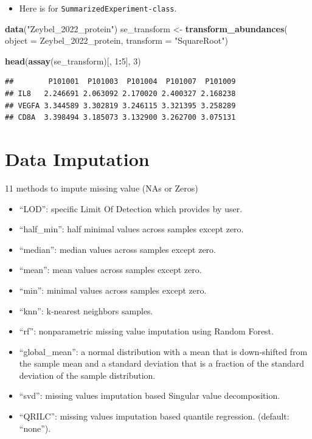 \documentclass[
]{book}
\newenvironment{Shaded}{\begin{snugshade}}{\end{snugshade}}
\newcommand{\AttributeTok}[1]{\textcolor[rgb]{0.13,0.29,0.53}{#1}}
\newcommand{\DecValTok}[1]{\textcolor[rgb]{0.00,0.00,0.81}{#1}}
\newcommand{\FunctionTok}[1]{\textcolor[rgb]{0.13,0.29,0.53}{\textbf{#1}}}
\newcommand{\NormalTok}[1]{#1}
\newcommand{\OtherTok}[1]{\textcolor[rgb]{0.56,0.35,0.01}{#1}}
\newcommand{\SpecialCharTok}[1]{\textcolor[rgb]{0.81,0.36,0.00}{\textbf{#1}}}
\newcommand{\StringTok}[1]{\textcolor[rgb]{0.31,0.60,0.02}{#1}}
\providecommand{\tightlist}{%
  \setlength{\itemsep}{0pt}\setlength{\parskip}{0pt}}
\begin{document}
\begin{itemize}
\tightlist
\item
  Here is for \texttt{SummarizedExperiment-class}.
\end{itemize}

\begin{Shaded}
\begin{Highlighting}[]
\FunctionTok{data}\NormalTok{(}\StringTok{"Zeybel\_2022\_protein"}\NormalTok{)}
\NormalTok{se\_transform }\OtherTok{\textless{}{-}} \FunctionTok{transform\_abundances}\NormalTok{(}
  \AttributeTok{object =}\NormalTok{ Zeybel\_2022\_protein,}
  \AttributeTok{transform =} \StringTok{"SquareRoot"}\NormalTok{)}

\FunctionTok{head}\NormalTok{(}\FunctionTok{assay}\NormalTok{(se\_transform)[, }\DecValTok{1}\SpecialCharTok{:}\DecValTok{5}\NormalTok{], }\DecValTok{3}\NormalTok{)}
\end{Highlighting}
\end{Shaded}

\begin{verbatim}
##        P101001  P101003  P101004  P101007  P101009
## IL8   2.246691 2.063092 2.170020 2.400327 2.168238
## VEGFA 3.344589 3.302819 3.246115 3.321395 3.258289
## CD8A  3.398494 3.185073 3.132900 3.262700 3.075131
\end{verbatim}

\hypertarget{data-imputation}{%
\section{Data Imputation}\label{data-imputation}}

11 methods to impute missing value (NAs or Zeros)

\begin{itemize}
\item
  ``LOD'': specific Limit Of Detection which provides by user.
\item
  ``half\_min'': half minimal values across samples except zero.
\item
  ``median'': median values across samples except zero.
\item
  ``mean'': mean values across samples except zero.
\item
  ``min'': minimal values across samples except zero.
\item
  ``knn'': k-nearest neighbors samples.
\item
  ``rf'': nonparametric missing value imputation using Random Forest.
\item
  ``global\_mean'': a normal distribution with a mean that is down-shifted from the sample mean and a standard deviation that is a fraction of the standard deviation of the sample distribution.
\item
  ``svd'': missing values imputation based Singular value decomposition.
\item
  ``QRILC'': missing values imputation based quantile regression. (default: ``none'').
\end{itemize}
\end{document}
